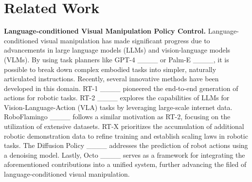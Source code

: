 \section{Related Work}
\label{sec:related_work}

\textbf{Language-conditioned Visual Manipulation Policy Control.} Language-conditioned visual manipulation has made significant progress due to advancements in large language models (LLMs) and vision-language models (VLMs).
By using task planners like GPT-4 ____ or Palm-E ____, it is possible to break down complex embodied tasks into simpler, naturally articulated instructions. Recently, several innovative methods have been developed in this domain. RT-1 ____ pioneered the end-to-end generation of actions for robotic tasks. RT-2 ____ explores the capabilities of LLMs for Vision-Language-Action (VLA) tasks by leveraging large-scale internet data. RoboFlamingo ____ follows a similar motivation as RT-2, focusing on the utilization of extensive datasets. RT-X prioritizes the accumulation of additional robotic demonstration data to refine training and establish scaling laws in robotic tasks. The Diffusion Policy ____ addresses the prediction of robot actions using a denoising model. Lastly, Octo ____ serves as a framework for integrating the aforementioned contributions into a unified system, further advancing the filed of language-conditioned visual manipulation.

